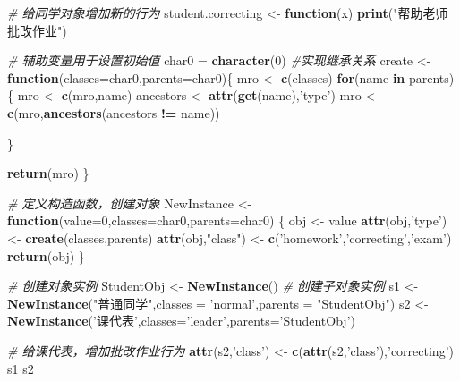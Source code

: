 \documentclass[]{book}
\newenvironment{Shaded}{\begin{snugshade}}{\end{snugshade}}
\newcommand{\KeywordTok}[1]{\textcolor[rgb]{0.13,0.29,0.53}{\textbf{#1}}}
\newcommand{\DataTypeTok}[1]{\textcolor[rgb]{0.13,0.29,0.53}{#1}}
\newcommand{\DecValTok}[1]{\textcolor[rgb]{0.00,0.00,0.81}{#1}}
\newcommand{\StringTok}[1]{\textcolor[rgb]{0.31,0.60,0.02}{#1}}
\newcommand{\CommentTok}[1]{\textcolor[rgb]{0.56,0.35,0.01}{\textit{#1}}}
\newcommand{\ControlFlowTok}[1]{\textcolor[rgb]{0.13,0.29,0.53}{\textbf{#1}}}
\newcommand{\OperatorTok}[1]{\textcolor[rgb]{0.81,0.36,0.00}{\textbf{#1}}}
\newcommand{\NormalTok}[1]{#1}
\begin{document}
\begin{Shaded}
\begin{Highlighting}[]
\CommentTok{# 给同学对象增加新的行为}
\NormalTok{student.correcting <-}\StringTok{ }\ControlFlowTok{function}\NormalTok{(x) }\KeywordTok{print}\NormalTok{(}\StringTok{"帮助老师批改作业"}\NormalTok{)}

\CommentTok{# 辅助变量用于设置初始值}
\NormalTok{char0 =}\StringTok{ }\KeywordTok{character}\NormalTok{(}\DecValTok{0}\NormalTok{)}
\CommentTok{#实现继承关系}
\NormalTok{create <-}\StringTok{ }\ControlFlowTok{function}\NormalTok{(}\DataTypeTok{classes=}\NormalTok{char0,}\DataTypeTok{parents=}\NormalTok{char0)\{}
\NormalTok{  mro <-}\StringTok{ }\KeywordTok{c}\NormalTok{(classes)}
  \ControlFlowTok{for}\NormalTok{(name }\ControlFlowTok{in}\NormalTok{ parents)\{}
\NormalTok{    mro <-}\StringTok{ }\KeywordTok{c}\NormalTok{(mro,name)}
\NormalTok{    ancestors <-}\StringTok{ }\KeywordTok{attr}\NormalTok{(}\KeywordTok{get}\NormalTok{(name),}\StringTok{'type'}\NormalTok{)}
\NormalTok{    mro <-}\StringTok{ }\KeywordTok{c}\NormalTok{(mro,}\KeywordTok{ancestors}\NormalTok{(ancestors }\OperatorTok{!=}\StringTok{ }\NormalTok{name))}
    
\NormalTok{  \}}
  
  \KeywordTok{return}\NormalTok{(mro)}
\NormalTok{\}}

\CommentTok{# 定义构造函数，创建对象}
\NormalTok{NewInstance <-}\StringTok{ }\ControlFlowTok{function}\NormalTok{(}\DataTypeTok{value=}\DecValTok{0}\NormalTok{,}\DataTypeTok{classes=}\NormalTok{char0,}\DataTypeTok{parents=}\NormalTok{char0) \{}
\NormalTok{  obj <-}\StringTok{ }\NormalTok{value}
  \KeywordTok{attr}\NormalTok{(obj,}\StringTok{'type'}\NormalTok{) <-}\StringTok{ }\KeywordTok{create}\NormalTok{(classes,parents)}
  \KeywordTok{attr}\NormalTok{(obj,}\StringTok{"class"}\NormalTok{) <-}\StringTok{ }\KeywordTok{c}\NormalTok{(}\StringTok{'homework'}\NormalTok{,}\StringTok{'correcting'}\NormalTok{,}\StringTok{'exam'}\NormalTok{)}
  \KeywordTok{return}\NormalTok{(obj)}
\NormalTok{\}}

\CommentTok{# 创建对象实例}
\NormalTok{StudentObj <-}\StringTok{ }\KeywordTok{NewInstance}\NormalTok{()}
\CommentTok{# 创建子对象实例}
\NormalTok{s1 <-}\StringTok{ }\KeywordTok{NewInstance}\NormalTok{(}\StringTok{"普通同学"}\NormalTok{,}\DataTypeTok{classes =} \StringTok{'normal'}\NormalTok{,}\DataTypeTok{parents =} \StringTok{"StudentObj"}\NormalTok{)}
\NormalTok{s2 <-}\StringTok{ }\KeywordTok{NewInstance}\NormalTok{(}\StringTok{'课代表'}\NormalTok{,}\DataTypeTok{classes=}\StringTok{'leader'}\NormalTok{,}\DataTypeTok{parents=}\StringTok{'StudentObj'}\NormalTok{)}

\CommentTok{# 给课代表，增加批改作业行为}
\KeywordTok{attr}\NormalTok{(s2,}\StringTok{'class'}\NormalTok{) <-}\StringTok{ }\KeywordTok{c}\NormalTok{(}\KeywordTok{attr}\NormalTok{(s2,}\StringTok{'class'}\NormalTok{),}\StringTok{'correcting'}\NormalTok{)}
\NormalTok{s1}
\NormalTok{s2}
\end{Highlighting}
\end{Shaded}
\end{document}
